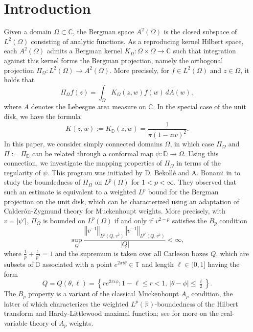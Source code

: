 \documentclass{amsart}
\newcommand{\norm}[1]{\left\Vert {#1}\right\Vert}
\theoremstyle{definition}
\numberwithin{equation}{section}
\begin{document}
\section{Introduction}
Given a domain $\Omega \subset \mathbb C$, the Bergman space $A^2(\Omega)$ is the closed subspace of $L^2(\Omega)$ consisting of analytic functions. As a reproducing kernel Hilbert space, each $A^2(\Omega)$ admits a Bergman kernel $K_\Omega \colon \Omega \times \Omega \to \mathbb C$ such that integration against this kernel forms the Bergman projection, namely the orthogonal projection $\Pi_\Omega \colon L^2(\Omega) \to A^2(\Omega)$. More precisely, for $f \in L^2(\Omega)$ and $z \in \Omega$, it holds that 
\begin{equation*}
\Pi_{\Omega}f(z)= \int_{\Omega} K_{\Omega}(z,w) f(w) \, dA(w), \label{BergmanL2Rep}
\end{equation*}  
where $A$ denotes the Lebesgue area measure on $\mathbb C$.
In the special case of the unit disk, we have the formula 
$$
   K(z,w) := K_{\mathbb{D}}(z,w) = \frac{1}{\pi (1-z\overline{w})^2}. 
$$
In this paper, we consider simply connected domains $\Omega$, in which case $\Pi_\Omega$ and $\Pi:=\Pi_{\mathbb D}$ can be related through a conformal map $\psi\colon\mathbb D \to \Omega$. Using this connection, we investigate the mapping properties of $\Pi_\Omega$ in terms of the regularity of $\psi$. 
This program was initiated by 
D. Bekoll\'e and A. Bonami in \cites{Bek82,Bek86,BB78} to study the boundedness of $\Pi_\Omega$ on $L^p(\Omega)$ for $1<p<\infty$. 
They observed that such an estimate is equivalent to a  weighted $L^p$ bound for the Bergman projection on the unit disk, which can be characterized using an adaptation of Calder\'on-Zygmund theory for Muckenhoupt weights. More precisely, with $v=|\psi'|$, $\Pi_\Omega$ is bounded on $L^p(\Omega)$ if and only if $v^{2-p}$ satisfies the $B_p$ condition
        \begin{equation}\label{e:Bp-intro}  \sup_Q \frac{\norm{v^{-1}}_{L^p(Q,v^2)} \norm{v^{-1}}_{L^{p'}(Q,v^2)} }{|Q|} < \infty,\end{equation}
where $\frac{1}{p}+\frac{1}{p'}=1$ and the supremum is taken over all Carleson boxes $Q$,
which are subsets of $\mathbb{D}$ associated with a point $e^{2 \pi i\theta} \in \mathbb T$ and length $\ell \in (0,1]$ having the form
    \[ Q=Q(\theta,\ell) = \left\{ re^{2 \pi i\phi} \colon 1-\ell \le r <1 , \, |\theta-\phi| \le \tfrac{\ell}{2} \right\}.\]
The $B_p$ property is a variant of the classical Muckenhoupt $A_p$ condition, the latter of which characterizes the weighted $L^p(\mathbb{R})$-boundedness of the Hilbert transform and Hardy-Littlewood maximal function; see \cites{CMP2011,Duo2001,GR1985,Gra14} for more on the real-variable theory of $A_p$ weights.
\end{document}
